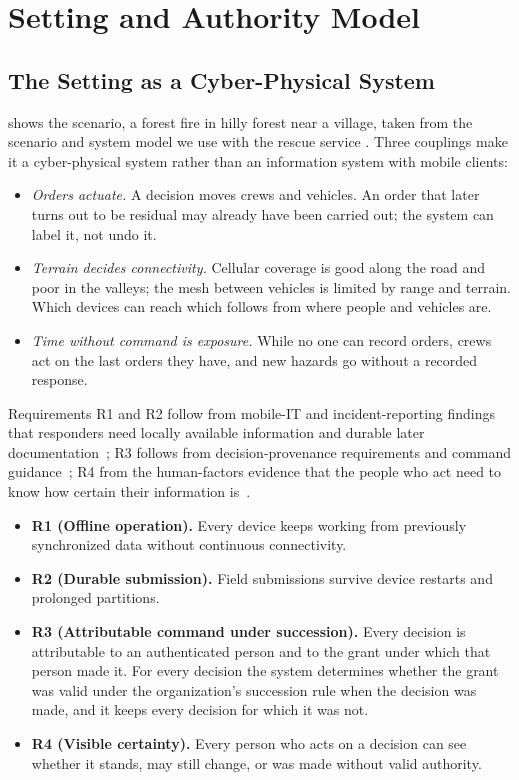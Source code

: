\section{Setting and Authority Model}
\label{sec:model}

\subsection{The Setting as a Cyber-Physical System}
\label{sec:setting}

 shows the scenario, a forest fire in hilly forest near a village,
taken from the scenario and system model we use with the rescue service
. Three couplings make it a cyber-physical system rather than an
information system with mobile clients:
\begin{itemize}
  \item \emph{Orders actuate.} A decision moves crews and vehicles. An order that later
  turns out to be residual may already have been carried out; the system can label it,
  not undo it.
  \item \emph{Terrain decides connectivity.} Cellular coverage is good along the road and
  poor in the valleys; the mesh between vehicles is limited by range and terrain. Which
  devices can reach which follows from where people and vehicles are.
  \item \emph{Time without command is exposure.} While no one can record orders, crews act
  on the last orders they have, and new hazards go without a recorded response.
\end{itemize}

Requirements R1 and R2 follow from mobile-IT and incident-reporting findings that
responders need locally available information and durable later
documentation~\cite{rsg-kommunalplan,pilemalm2014enabling,westman2021mobilisation}; R3
follows from decision-provenance requirements and command
guidance~\cite{naja2010provenance,rsg-rad201}; R4 from the human-factors evidence that the
people who act need to know how certain their information is~\cite{endsley2017autonomy}.
\begin{itemize}
  \item \textbf{R1 (Offline operation).} Every device keeps working from previously
  synchronized data without continuous connectivity.
  \item \textbf{R2 (Durable submission).} Field submissions survive device restarts and
  prolonged partitions.
  \item \textbf{R3 (Attributable command under succession).} Every decision is attributable
  to an authenticated person and to the grant under which that person made it. For every
  decision the system determines whether the grant was valid under the organization's
  succession rule when the decision was made, and it keeps every decision for which it
  was not.
  \item \textbf{R4 (Visible certainty).} Every person who acts on a decision can see whether
  it stands, may still change, or was made without valid authority.
\end{itemize}


